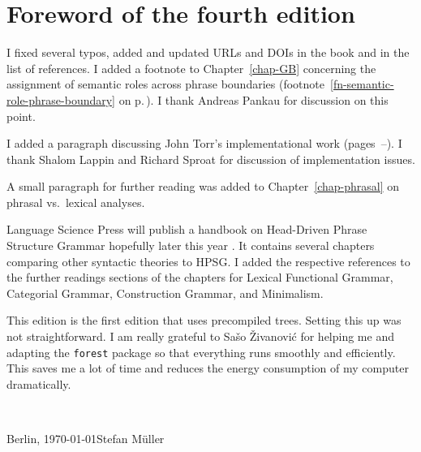 
\section*{Foreword of the fourth edition}













I fixed several typos, added and updated URLs and DOIs in the book and in the list of references.
I added a footnote to Chapter~\ref{chap-GB} concerning the assignment of semantic roles
across phrase boundaries (footnote~\ref{fn-semantic-role-phrase-boundary} on
p.\,\pageref{fn-semantic-role-phrase-boundary}). I thank Andreas Pankau for discussion on this point.

I added a paragraph discussing John Torr's implementational work (pages~\pageref{page-torr-implementation-beginning}--\pageref{page-torr-implementation-end}). I thank Shalom Lappin and Richard Sproat for discussion of implementation issues.

A small paragraph for further reading was added to Chapter~\ref{chap-phrasal} on phrasal vs.\ lexical analyses.

Language Science Press will publish a handbook on Head-Driven Phrase Structure Grammar hopefully
later this year \citep*{HPSGHandbook}. It contains several chapters comparing other syntactic
theories to HPSG. I added the respective references to the further readings sections of the chapters
for Lexical Functional Grammar, Categorial Grammar, Construction Grammar, and Minimalism.

This edition is the first edition that uses precompiled trees. Setting this up was not
straightforward. I am really grateful to Sašo Živanović for helping me and adapting the
\texttt{forest} package so that everything runs smoothly and efficiently. This saves me a lot of
time and reduces the energy consumption of my computer dramatically.


~\medskip

\noindent
Berlin, \today\hfill Stefan Müller



